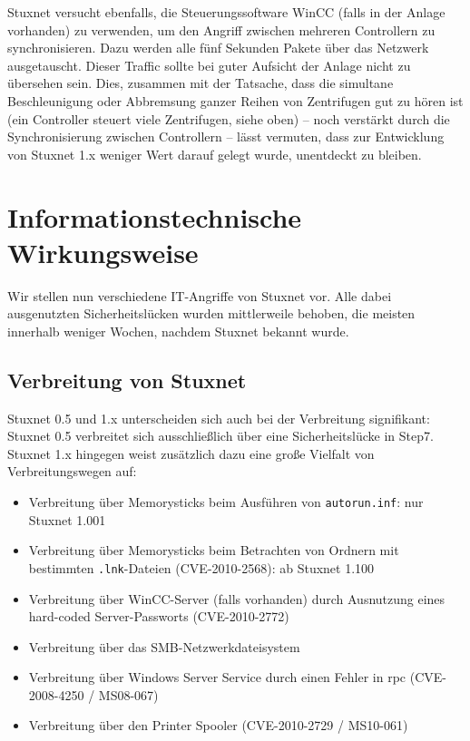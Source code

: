 \documentclass[a4paper]{article}
\begin{document}
Stuxnet versucht ebenfalls, die Steuerungssoftware WinCC (falls in der Anlage vorhanden) zu verwenden, um den Angriff zwischen mehreren Controllern zu synchronisieren.\cite{dossier}
Dazu werden alle fünf Sekunden Pakete über das Netzwerk ausgetauscht.
Dieser Traffic sollte bei guter Aufsicht der Anlage nicht zu übersehen sein.
Dies, zusammen mit der Tatsache, dass die simultane Beschleunigung oder Abbremsung ganzer Reihen von Zentrifugen gut zu hören ist
(ein Controller steuert viele Zentrifugen, siehe oben) – noch verstärkt durch die Synchronisierung zwischen Controllern –
lässt vermuten, dass zur Entwicklung von Stuxnet 1.x weniger Wert darauf gelegt wurde, unentdeckt zu bleiben.

\section{Informationstechnische Wirkungsweise}

Wir stellen nun verschiedene IT-Angriffe von Stuxnet vor.
Alle dabei ausgenutzten Sicherheitslücken wurden mittlerweile behoben, die meisten innerhalb weniger Wochen, nachdem Stuxnet bekannt wurde.

\subsection{Verbreitung von Stuxnet}

Stuxnet 0.5 und 1.x unterscheiden sich auch bei der Verbreitung signifikant:
Stuxnet 0.5 verbreitet sich ausschließlich über eine Sicherheitslücke in Step7.
Stuxnet 1.x hingegen weist zusätzlich dazu eine große Vielfalt von Verbreitungswegen auf:

\begin{itemize}
\item Verbreitung über Memorysticks beim Ausführen von \texttt{autorun.inf}: nur Stuxnet 1.001\cite{dossier} %
\item Verbreitung über Memorysticks beim Betrachten von Ordnern mit bestimmten \texttt{.lnk}-Dateien (CVE-2010-2568\cite{CVE_lnk}): ab Stuxnet 1.100
\item Verbreitung über WinCC-Server (falls vorhanden) durch Ausnutzung eines hard-coded Server-Passworts (CVE-2010-2772\cite{CVE_wincc})
\item Verbreitung über das SMB-Netzwerkdateisystem
\item Verbreitung über Windows Server Service durch einen Fehler in \gls{rpc} (CVE-2008-4250\cite{CVE_rpc} / MS08-067\cite{MS_rpc})
\item Verbreitung über den Printer Spooler (CVE-2010-2729\cite{CVE_spooler} / MS10-061\cite{MS_spooler})
\end{itemize} %
\end{document}
